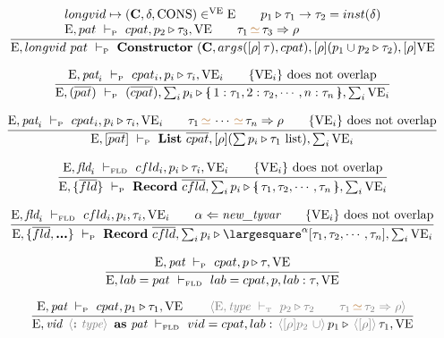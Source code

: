 \documentclass[11pt,a4paper]{article}
\newcommand{\key}[1]{\textrm{\textbf{#1}}}
\newcommand{\prodlhs}[1]{\textit{#1}}
\newcommand{\record}[1]{\{\!\!\shortmid #1 \shortmid\!\!\}}
\newcommand{\irecrd}[2]{\largesquare^{#1}{#2}}
\newcommand{\qualtype}[2]{#1 \triangleright #2}
\newcommand{\unify}[3]{#1\,{\color{brown}{\simeq}}\,#2 \Rightarrow #3}
\newcommand{\unifylist}[3]{#1\,{\color{brown}{\simeq}}\,\cdots\,{\color{brown}{\simeq}}\,#2 \Rightarrow #3}
\newcommand{\subst}[2]{[#1]\,#2}
\newcommand{\braced}[1]{\{#1\}}
\newcommand{\angled}[1]{\,{\color{gray}\langle#1\rangle}\,}
\newcommand{\Env}  {\textrm{E}}
\newcommand{\VE}   {\textrm{VE}}
\newcommand{\VKC}  {\textrm{CONS}}
\newcommand{\vcon} {\mathbf{C}}
\newcommand{\vdashP}  {\ \vdash_{\textrm{\tiny P}}\  }
\newcommand{\vdashT}  {\ \vdash_{\textrm{\tiny T}}\  }
\newcommand{\vdashFLD}{\ \vdash_\textrm{\tiny FLD}\  }
\newcommand{\corenew}[1]{\textit{new\_#1}}
\newcommand{\vect}[1]{\overline{#1}}
\begin{document}
\[
\cfrac
 {\begin{array}{l}
  longvid \mapsto (\vcon, \delta, \VKC) \in^\VE \Env     \qquad
  \qualtype{p_1}{\tau_1\to\tau_2} = inst(\delta)         \\
  \Env,pat \vdashP cpat, \qualtype{p_2}{\tau_3},\VE      \qquad
  \unify{\tau_1}{\tau_3}{\rho}                           \\
  \end{array}}
 {\Env, longvid\ pat \vdashP \key{Constructor}\ (\vcon, args(\subst{\rho}{\tau}), cpat), [\rho](\qualtype{p_1 \cup p_2}{\tau_2}), [\rho]\VE}
\]

\[
\cfrac
 {\Env,\prodlhs{pat}_i \vdashP cpat_i,\qualtype{p_i}{\tau_i},\VE_i \qquad
  \braced{\VE_i}\ \textrm{does not overlap}}
 {\Env, (\vect{pat}) \vdashP
  (\vect{cpat}), \qualtype{\sum_i p_i}{\record{1:\tau_1,2:\tau_2,\cdots,n:\tau_n}}, \sum_i\VE_i}
\]

\[
\cfrac
 {\Env,\prodlhs{pat}_i \vdashP cpat_i,\qualtype{p_i}{\tau_i},\VE_i  \qquad
  \unifylist{\tau_1}{\tau_n}{\rho}                                  \qquad
  \braced{\VE_i}\ \textrm{does not overlap}}
 {\Env, [\vect{pat}] \vdashP
    \key{List}\ \vect{cpat}, [\rho](\qualtype{\sum p_i}{\tau_1\ \textrm{list}}), \sum_i\VE_i}
\]

\[
\cfrac
 {\Env,\prodlhs{fld}_i \vdashFLD cfld_i,\qualtype{p_i}{\tau_i},\VE_i \qquad
  \braced{\VE_i}\ \textrm{does not overlap}}
 {\Env, \braced{\vect{fld}} \vdashP
    \key{Record}\ \vect{cfld}, \qualtype{\sum_i p_i}{\record{\tau_1,\tau_2,\cdots,\tau_n}}, \sum_i\VE_i}
\]

\[
\cfrac
 {\Env,\prodlhs{fld}_i \vdashFLD cfld_i,p_i,\tau_i,\VE_i \qquad
  \alpha \Leftarrow \corenew{tyvar}                      \qquad
  \braced{\VE_i}\ \textrm{does not overlap}}
 {\Env, \braced{\vect{fld},\key{...}} \vdashP
    \key{Record}\ \vect{cfld}, \qualtype{\sum_i p_i}{\irecrd{\alpha}{[\tau_1,\tau_2,\cdots,\tau_n]}}, \sum_i\VE_i}
\]

\[
\cfrac
 {\Env,\prodlhs{pat} \vdashP cpat, \qualtype{p}{\tau}, \VE}
 {\Env, lab = pat \vdashFLD lab=cpat, p, lab:\tau, \VE }
\]

\[
\cfrac
 {\Env,\prodlhs{pat}  \vdashP cpat,\qualtype{p_1}{\tau_1}, \VE      \qquad
  \angled{\Env,\prodlhs{type} \vdashT \qualtype{p_2}{\tau_2}        \qquad
  \unify{\tau_1}{\tau_2}{\rho}}}
 {\Env, \prodlhs{vid}\ \angled{\key{:}\ \prodlhs{type}}\ \key{as}\ \prodlhs{pat}  \vdashFLD 
    vid=cpat, lab:\qualtype{\angled{[\rho]p_2\ \cup} p_1}{\angled{[\rho]}\tau_1}, \VE }
\]
\end{document}
